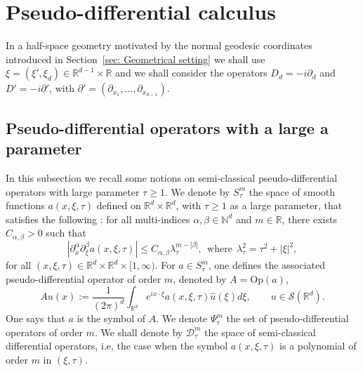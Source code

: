 \documentclass[JEP,XML,SOM,Unicode,published]{cedram}
\theoremstyle{plain}
\theoremstyle{definition}
\def\R{\mathbb{R}}
\def\N{\mathbb{N}}
\newcommand{\Op}{\ensuremath{\mathrm{Op}}}
\newcommand{\lsc}{\lambda_\tau}
\newcommand{\Ssc}{S_\tau}
\newcommand{\Psisc}{\Psi_\tau}
\newcommand{\Dsc}{\mathscr{D}_{\tau}}
\begin{document}
\section{Pseudo-differential calculus}
\label{sec: Psido}

In a half-space geometry motivated by the normal geodesic coordinates
introduced in Section~\ref{sec: Geometrical setting}
we shall use $\xi=(\xi',\xi_d)\in\R^{d-1}\times\R$ and we shall
consider the operators $D_d=-i\partial_d$ and $D'=-i\partial'$, with
$\partial' = (\partial_{x_1}, \dots, \partial_{x_{d-1}})$.

\subsection{Pseudo-differential operators with a large a parameter}\label{ss1}
In this subsection we recall some notions on semi-classical
pseudo-differential operators with large parameter $\tau\geq 1$. We
denote by $\Ssc^m$ the space of smooth functions $a(x,\xi,\tau)$
defined on $\R^d\times\R^d$, with $\tau\geq 1$ as a large parameter,
that satisfies the following : for all multi-indices
$\alpha,\beta\in\N^d$ and $m\in\R$, there exists
$C_{\alpha,\beta}>0$ such
that
\begin{equation*}
|\partial_x^{\alpha}\partial^{\beta}_{\xi}a(x,\xi,\tau)|
\leq C_{\alpha,\beta}\lsc^{m-|\beta|},
\ \ \text{where} \ \ \lsc^2=\tau^2+|\xi|^2,
\end{equation*}
for all
$(x,\xi,\tau)\in\R^d\times\R^d\times [1, \infty)$. For $a\in \Ssc^m$,
one defines the associated pseudo-differential operator of order $m$, denoted by
$A=\Op (a)$,
\begin{equation*}
Au(x):=\frac{1}{(2\pi)^d}
\int_{\R^d}e^{ix\cdot\xi}a(x,\xi,\tau)\hat{u}(\xi)d\xi,
\qquad u\in \mathscr{S}(\R^d).
\end{equation*}
One says that $a$ is the symbol of $A$. We denote $\Psisc^m$ the set
of pseudo-differential operators of order $m$. We shall denote by
$\Dsc^m$ the space of semi-classical differential operators, i.e, the
case when the symbol $a(x,\xi,\tau)$ is a polynomial of order
$m$ in $(\xi,\tau)$.
\end{document}
